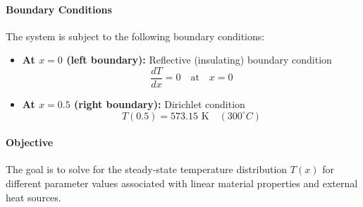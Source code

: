 \documentclass{article}
\begin{document}
	\paragraph{Boundary Conditions}
	The system is subject to the following boundary conditions:
	\begin{itemize}
		\item \textbf{At \( x = 0 \) (left boundary):} Reflective (insulating) boundary condition
		\begin{equation}
			\frac{dT}{dx} = 0 \quad \text{at} \quad x = 0
		\end{equation}
		\item \textbf{At \( x = 0.5 \) (right boundary):} Dirichlet condition
		\begin{equation}
			T(0.5) = 573.15 \text{ K} \quad (300^\circ C)
		\end{equation}
	\end{itemize}
	
	\paragraph{Objective}
	The goal is to solve for the steady-state temperature distribution \( T(x) \) for different parameter values associated with linear material properties and external heat sources.
	
\end{document}
